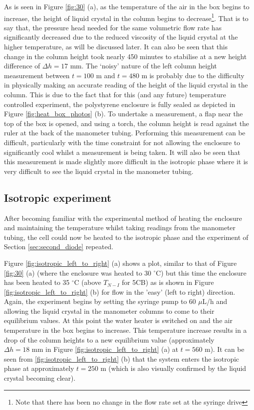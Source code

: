 As is seen in Figure \ref{fig:30} (a), as the temperature of the air in the box begins to increase, the height of liquid crystal in the column begins to decrease\footnote{Note that there has been no change in the flow rate set at the syringe drive}. That is to say that, the pressure head needed for the same volumetric flow rate has significantly decreased due to the reduced viscosity of the liquid crystal at the higher temperature, as will be discussed later. It can also be seen that this change in the column height took nearly 450 minutes to stabilise at a new height difference of  $\Delta h=17\text{ mm}$. The `noisy' nature of the left column height measurement between $t=100\text{ m}$ and $t=480\text{ m}$ is probably due to the difficulty in physically making an accurate reading of the height of the liquid crystal in the column. This is due to the fact that for this (and any future) temperature controlled experiment, the polystyrene enclosure is fully sealed as depicted in Figure \ref{fig:heat_box_photos} (b). To undertake a measurement, a flap near the top of the box is opened, and using a torch, the column height is read against the ruler at the back of the manometer tubing. Performing this measurement can be difficult, particularly with the time constraint for not allowing the enclosure to significantly cool whilst a measurement is being taken. It will also be seen that this measurement is made slightly more difficult in the isotropic phase where it is very difficult to see the liquid crystal in the manometer tubing.

\subsection{Isotropic experiment}
\label{sec:iso_experiment}
After becoming familiar with the experimental method of heating the enclosure and maintaining the temperature whilst taking readings from the manometer tubing, the cell could now be heated to the isotropic phase and the experiment of Section \ref{sec:second_diode} repeated.

Figure \ref{fig:isotropic_left_to_right} (a) shows a plot, similar to that of Figure \ref{fig:30} (a) (where the enclosure was heated to 30 $^{\circ}\text{C}$) but this time the enclosure has been heated to 35 $^{\circ}\text{C}$ (above $T_{N-I}$ for 5CB) as is shown in Figure \ref{fig:isotropic_left_to_right} (b) for flow in the 'easy' (left to right) direction. Again, the experiment begins by setting the syringe pump to 60 $\mu$L/h and allowing the liquid crystal in the manometer columns to come to their equilibrium values. At this point the water heater is switched on and the air temperature in the box begins to increase. This temperature increase results in a drop of the column heights to a new equilibrium value (approximately $\Delta h=18\text{ mm}$ in Figure \ref{fig:isotropic_left_to_right} (a) at $t=560\text{ m}$). It can be seen from \ref{fig:isotropic_left_to_right} (b) that the system enters the isotropic phase at approximately $t=250\text{ m}$ (which is also visually confirmed by the liquid crystal becoming clear).

